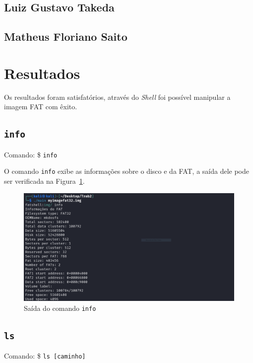 \documentclass[
    12pt,				%
    oneside,   	        %
    a4paper,			%
    english,			%
    french,				%
    spanish,			%
    brazil,				%
    ]{pacotes/abntex2}
\begin{document}
\subsection{Luiz Gustavo Takeda}
\label{subsec:luizinho}

\subsection{Matheus Floriano Saito}
\label{subsec:peixoto}



\graphicspath{ {./figuras/resultados} }

\section{Resultados}
\label{sec:resultados}
Os resultados foram satisfatórios, através do \textit{Shell} foi possível manipular a imagem FAT com êxito.


\subsection{\texttt{info}}
\label{subsec:info}
Comando: \$ \texttt{info}
 
O comando \texttt{info} exibe as informações sobre o disco e da FAT, a saída dele pode ser verificada na Figura~\ref{fig:info}.

\begin{figure}[H]
    \centering
    \includegraphics[width=450pt]{0-info.PNG}
    \caption{Saída do comando \texttt{info}}
    \label{fig:info}
\end{figure}


\subsection{\texttt{ls}}
\label{subsec:ls}
Comando: \$ \texttt{ls [caminho]} 
\end{document}
